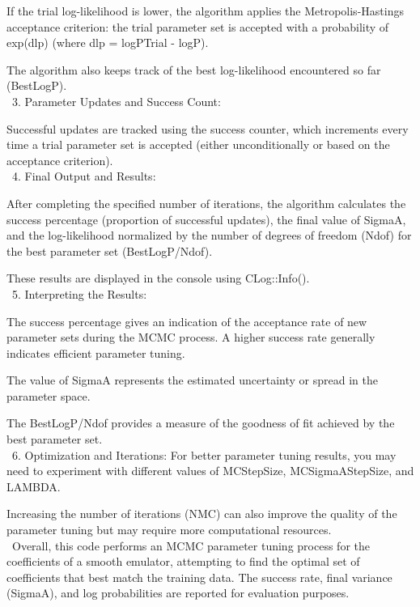 \documentclass[12pt]{article}
\numberwithin{equation}{section}
\numberwithin{figure}{section}
\begin{document}
If the trial log-likelihood is lower, the algorithm applies the Metropolis-Hastings acceptance criterion: the trial parameter set is accepted with a probability of exp(dlp) (where dlp = logPTrial - logP).

The algorithm also keeps track of the best log-likelihood encountered so far (BestLogP). \\

\ 3. Parameter Updates and Success Count:

Successful updates are tracked using the success counter, which increments every time a trial parameter set is accepted (either unconditionally or based on the acceptance criterion). \\ 

\ 4. Final Output and Results:

After completing the specified number of iterations, the algorithm calculates the success percentage (proportion of successful updates), the final value of SigmaA, and the log-likelihood normalized by the number of degrees of freedom (Ndof) for the best parameter set (BestLogP/Ndof).

These results are displayed in the console using CLog::Info(). \\ 

\ 5. Interpreting the Results:

The success percentage gives an indication of the acceptance rate of new parameter sets during the MCMC process. A higher success rate generally indicates efficient parameter tuning.

The value of SigmaA represents the estimated uncertainty or spread in the parameter space.

The BestLogP/Ndof provides a measure of the goodness of fit achieved by the best parameter set. \\

\ 6. Optimization and Iterations:
For better parameter tuning results, you may need to experiment with different values of MCStepSize, MCSigmaAStepSize, and LAMBDA.

Increasing the number of iterations (NMC) can also improve the quality of the parameter tuning but may require more computational resources. \\

\ Overall, this code performs an MCMC parameter tuning process for the coefficients of a smooth emulator, attempting to find the optimal set of coefficients that best match the training data. The success rate, final variance (SigmaA), and log probabilities are reported for evaluation purposes. \\ 
\end{document}

